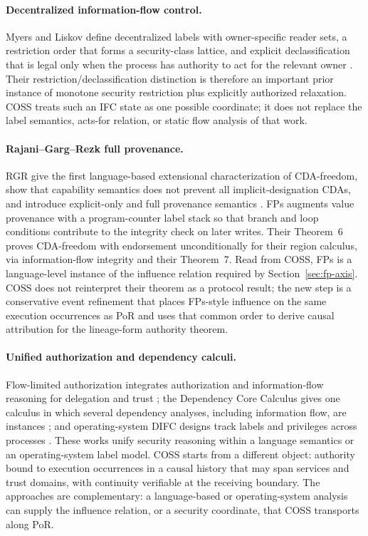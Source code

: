 \documentclass[10pt,twocolumn]{article}
\newcommand{\Model}{\textnormal{\textsc{COSS}}\xspace}
\begin{document}
\paragraph{Decentralized information-flow control.}
Myers and Liskov define decentralized labels with owner-specific reader sets,
a restriction order that forms a security-class lattice, and explicit
declassification that is legal only when the process has authority to act for
the relevant owner \cite{myers_liskov1997}.  Their restriction/declassification
distinction is therefore an important prior instance of monotone security
restriction plus explicitly authorized relaxation.  \Model treats such an IFC
state as one possible coordinate; it does not replace the label semantics,
acts-for relation, or static flow analysis of that work.

\paragraph{Rajani--Garg--Rezk full provenance.}
RGR give the first language-based extensional characterization of CDA-freedom,
show that capability semantics does not prevent all implicit-designation CDAs,
and introduce explicit-only and full provenance semantics
\cite{rajani_garg_rezk2016}. FPs augments value provenance with a
program-counter label stack so that branch and loop conditions contribute to
the integrity check on later writes. Their Theorem~6 proves CDA-freedom with
endorsement unconditionally for their region calculus, via information-flow
integrity and their Theorem~7. Read from \Model, FPs is a language-level
instance of the influence relation required by Section~\ref{sec:fp-axis}.
\Model does not reinterpret their theorem as a protocol result; the new step is
a conservative event refinement that places FPs-style influence on the same
execution occurrences as PoR and uses that common order to derive causal
attribution for the lineage-form authority theorem.

\paragraph{Unified authorization and dependency calculi.}
Flow-limited authorization integrates authorization and information-flow
reasoning for delegation and trust \cite{arden_liu_myers2015}; the Dependency
Core Calculus gives one calculus in which several dependency analyses,
including information flow, are instances \cite{abadi_dcc1999}; and
operating-system DIFC designs track labels and privileges across processes
\cite{asbestos2005,histar2006,flume2007}. These works unify security reasoning
within a language semantics or an operating-system label model. \Model starts
from a different object: authority bound to execution occurrences in a causal
history that may span services and trust domains, with continuity verifiable
at the receiving boundary. The approaches are complementary: a language-based
or operating-system analysis can supply the influence relation, or a security
coordinate, that \Model transports along PoR.
\end{document}
